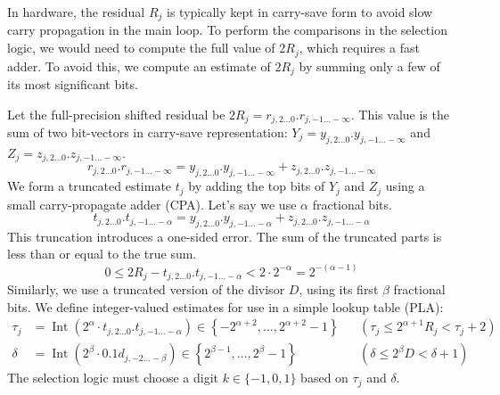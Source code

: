 \documentclass{article}
\DeclareMathOperator{\Int}{Int}
\begin{document}
In hardware, the residual $R_j$ is typically kept in carry-save form to avoid slow carry propagation in the main loop.
To perform the comparisons in the selection logic, we would need to compute the full value of $2R_j$, which requires a fast adder.
To avoid this, we compute an estimate of $2R_j$ by summing only a few of its most significant bits.

Let the full-precision shifted residual be $2 R_j = r_{j,2\ldots0}.r_{j,-1\ldots-\infty}$.
This value is the sum of two bit-vectors in carry-save representation:
$Y_j = y_{j,2\ldots0}.y_{j,-1\ldots-\infty}$ and $Z_j = z_{j,2\ldots0}.z_{j,-1\ldots-\infty}$.
\begin{equation}
  \label{eq:division:radix2_cs_sum}
  r_{j,2\ldots0}.r_{j,-1\ldots-\infty} = y_{j,2\ldots0}.y_{j,-1\ldots-\infty} + z_{j,2\ldots0}.z_{j,-1\ldots-\infty}
\end{equation}
We form a truncated estimate $t_j$ by adding the top bits of $Y_j$ and $Z_j$ using a small carry-propagate adder (CPA).
Let's say we use $\alpha$ fractional bits.
\begin{equation}
  \label{eq:division:radix2_trunc_sum}
  t_{j,2\ldots0}.t_{j,-1\ldots-\alpha} = y_{j,2\ldots0}.y_{j,-1\ldots-\alpha} + z_{j,2\ldots0}.z_{j,-1\ldots-\alpha}
\end{equation}
This truncation introduces a one-sided error.
The sum of the truncated parts is less than or equal to the true sum.
\begin{equation}
  \label{eq:division:radix2_trunc_error}
  0 \leq 2 R_j - t_{j,2\ldots0}.t_{j,-1\ldots-\alpha} < 2 \cdot 2^{-\alpha} = 2^{-(\alpha-1)}
\end{equation}
Similarly, we use a truncated version of the divisor $D$, using its first $\beta$ fractional bits.
We define integer-valued estimates for use in a simple lookup table (PLA):
\begin{align}
  \label{eq:division:radix2_tau_def}
  \tau_j &= \Int(2^\alpha \cdot t_{j,2\ldots0}.t_{j,-1\ldots-\alpha}) \in \left\{-2^{\alpha+2}, \dots, 2^{\alpha+2}-1\right\} && (\tau_j \leq 2^{\alpha+1} R_j < \tau_j + 2) \\
  \label{eq:division:radix2_delta_def}
  \delta &= \Int(2^\beta \cdot 0.1d_{j,-2\ldots-\beta}) \in \left\{2^{\beta-1}, \dots, 2^\beta-1\right\} && (\delta \leq 2^\beta D < \delta + 1)
\end{align}
The selection logic must choose a digit $k \in \{-1, 0, 1\}$ based on $\tau_j$ and $\delta$.
\end{document}
